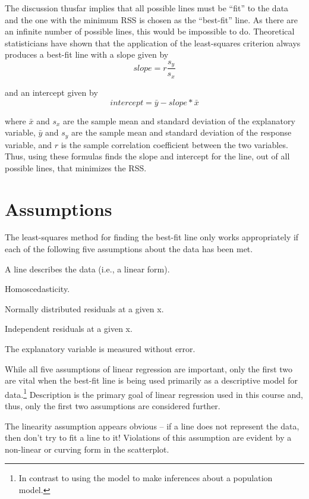 \documentclass[10pt,openany]{book}\usepackage[]{graphicx}\usepackage[]{color}
\begin{document}
The discussion thusfar implies that all possible lines must be ``fit'' to the data and the one with the minimum RSS is chosen as the ``best-fit'' line. As there are an infinite number of possible lines, this would be impossible to do. Theoretical statisticians have shown that the application of the least-squares criterion always produces a best-fit line with a slope given by
  \[ slope = r\frac{s_{y}}{s_{x}}  \]

and an intercept given by
  \[ intercept = \bar{y}-slope*\bar{x}   \]

where $\bar{x}$ and $s_{x}$ are the sample mean and standard deviation of the explanatory variable, $\bar{y}$ and $s_{y}$ are the sample mean and standard deviation of the response variable, and $r$ is the sample correlation coefficient between the two variables. Thus, using these formulas finds the slope and intercept for the line, out of all possible lines, that minimizes the RSS.


\section{Assumptions}\label{sect:RegAssumptions}
The least-squares method for finding the best-fit line only works appropriately if each of the following five assumptions about the data has been met.

\begin{Enumerate}
  \item A line describes the data (i.e., a linear form).
  \item Homoscedasticity.
  \item Normally distributed residuals at a given x.
  \item Independent residuals at a given x.
  \item The explanatory variable is measured without error.
\end{Enumerate}

While all five assumptions of linear regression are important, only the first two are vital when the best-fit line is being used primarily as a descriptive model for data.\footnote{In contrast to using the model to make inferences about a population model.}  Description is the primary goal of linear regression used in this course and, thus, only the first two assumptions are considered further.

The linearity assumption appears obvious -- if a line does not represent the data, then don't try to fit a line to it!  Violations of this assumption are evident by a non-linear or curving form in the scatterplot.
\end{document}
